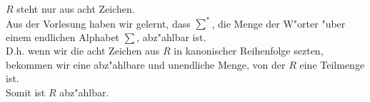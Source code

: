 \documentclass[a4paper,11pt]{scrartcl}
\begin{document}
	$R$ steht nur aus acht Zeichen. \\
	Aus der Vorlesung haben wir gelernt, dass $\sum ^{*}$, die Menge der W"orter "uber einem endlichen Alphabet $\sum$, abz"ahlbar ist.\\
	D.h. wenn wir die acht Zeichen aus $R$ in kanonischer Reihenfolge sezten, bekommen wir eine abz"ahlbare und unendliche Menge, von der $R$ eine Teilmenge ist.\\
	Somit ist $R$ abz"ahlbar.
	





















	
\end{document}
